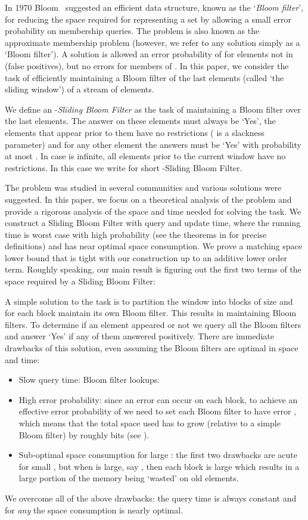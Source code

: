 \documentclass[11pt]{article}
\begin{document}
In 1970 Bloom~\cite{Bloom70} suggested an efficient data structure, known as the `\emph{Bloom filter}', for reducing the space required for representing a set  by allowing a small error probability on membership queries. The problem is also known as the approximate membership problem (however, we refer to any solution simply as a `Bloom filter'). A solution is allowed an error probability of  for elements not in  (false positives), but no errors for members of . In this paper, we consider the task of efficiently maintaining a Bloom filter of the last  elements (called `the sliding window') of a stream of elements.

We define an -\emph{Sliding Bloom Filter} as the task of maintaining a Bloom filter over the last  elements. The answer on these elements must always be `Yes', the  elements that appear prior to them have no restrictions ( is a slackness parameter) and for any other element the answers must be `Yes' with probability at most . In case  is infinite, all elements prior to the current window have no restrictions. In this case we write for short -Sliding Bloom Filter.

The problem was studied in several communities and various solutions were suggested. In this paper, we focus on a theoretical analysis of the problem and provide a rigorous analysis of the space and time needed for solving the task. We construct a Sliding Bloom Filter with  query and update time, where the running time is worst case with high probability (see the theorems in  for precise definitions) and has near optimal space consumption. We prove a matching space lower bound that is tight with our construction up to an additive lower order term. Roughly speaking, our main result is figuring out the first two terms of the space required by a Sliding Bloom Filter: 

A simple solution to the task is to partition the window into blocks of size  and for each block maintain its own Bloom filter. This results in maintaining  Bloom filters. To determine if an element appeared or not we query all the Bloom filters and answer `Yes' if any of them answered positively. There are immediate drawbacks of this solution, even assuming the Bloom filters are optimal in space and time:
\begin{itemize}
\item Slow query time:  Bloom filter lookups.
\item High error probability: since an error can occur on each block, to achieve an effective error probability of  we need to set each Bloom filter to have error , which means that the total space used has to grow (relative to a simple Bloom filter) by roughly  bits (see ).
\item Sub-optimal space consumption for large : the first two drawbacks are acute for small , but when  is large, say , then each block is large which results in a large portion of the memory being `wasted' on old elements.
\end{itemize}
We overcome all of the above drawbacks: the query time is always constant and for \emph{any}  the space consumption is nearly optimal.
\end{document}
